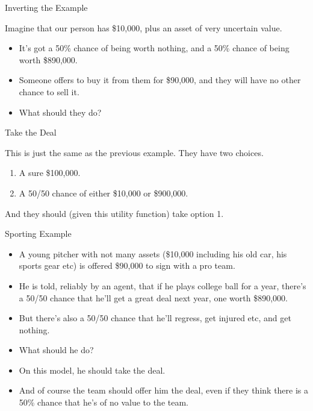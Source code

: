 \documentclass[
  ignorenonframetext,
]{beamer}
\providecommand{\tightlist}{%
  \setlength{\itemsep}{0pt}\setlength{\parskip}{0pt}}
\renewcommand{\,}{\text{, }}
\begin{document}
\begin{frame}{Inverting the Example}
\protect\hypertarget{inverting-the-example}{}

Imagine that our person has \$10,000, plus an asset of very uncertain
value.

\begin{itemize}
\tightlist
\item
  It's got a 50\% chance of being worth nothing, and a 50\% chance of
  being worth \$890,000.
\item
  Someone offers to buy it from them for \$90,000, and they will have no
  other chance to sell it.
\item
  What should they do?
\end{itemize}

\end{frame}

\begin{frame}{Take the Deal}
\protect\hypertarget{take-the-deal}{}

This is just the same as the previous example. They have two choices.

\begin{enumerate}
\tightlist
\item
  A sure \$100,000.
\item
  A 50/50 chance of either \$10,000 or \$900,000.
\end{enumerate}

And they should (given this utility function) take option 1.

\end{frame}

\begin{frame}{Sporting Example}
\protect\hypertarget{sporting-example}{}

\begin{itemize}
\tightlist
\item
  A young pitcher with not many assets (\$10,000 including his old car,
  his sports gear etc) is offered \$90,000 to sign with a pro team.
\item
  He is told, reliably by an agent, that if he plays college ball for a
  year, there's a 50/50 chance that he'll get a great deal next year,
  one worth \$890,000.
\item
  But there's also a 50/50 chance that he'll regress, get injured etc,
  and get nothing.
\item
  What should he do?
\item
  On this model, he should take the deal.
\item
  And of course the team should offer him the deal, even if they think
  there is a 50\% chance that he's of no value to the team.
\end{itemize}

\end{frame}
\end{document}
